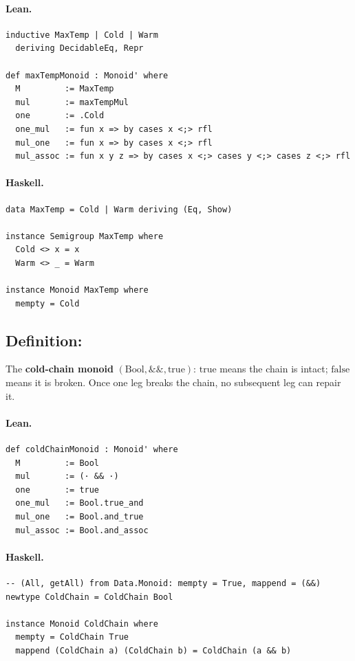 \documentclass[11pt,a4paper]{article}
\begin{document}
\paragraph{Lean.}
\begin{lstlisting}[style=lean]
inductive MaxTemp | Cold | Warm
  deriving DecidableEq, Repr

def maxTempMonoid : Monoid' where
  M         := MaxTemp
  mul       := maxTempMul
  one       := .Cold
  one_mul   := fun x => by cases x <;> rfl
  mul_one   := fun x => by cases x <;> rfl
  mul_assoc := fun x y z => by cases x <;> cases y <;> cases z <;> rfl
\end{lstlisting}

\paragraph{Haskell.}
\begin{lstlisting}[style=haskell]
data MaxTemp = Cold | Warm deriving (Eq, Show)

instance Semigroup MaxTemp where
  Cold <> x = x
  Warm <> _ = Warm

instance Monoid MaxTemp where
  mempty = Cold
\end{lstlisting}


\subsection{Definition: }

\begin{defn}
The \textbf{cold-chain monoid} $(\mathrm{Bool}, \mathbin{\&\&}, \mathrm{true})$:
$\mathrm{true}$ means the chain is intact; $\mathrm{false}$ means it is broken.
Once one leg breaks the chain, no subsequent leg can repair it.
\end{defn}

\paragraph{Lean.}
\begin{lstlisting}[style=lean]
def coldChainMonoid : Monoid' where
  M         := Bool
  mul       := (· && ·)
  one       := true
  one_mul   := Bool.true_and
  mul_one   := Bool.and_true
  mul_assoc := Bool.and_assoc
\end{lstlisting}

\paragraph{Haskell.}
\begin{lstlisting}[style=haskell]
-- (All, getAll) from Data.Monoid: mempty = True, mappend = (&&)
newtype ColdChain = ColdChain Bool

instance Monoid ColdChain where
  mempty = ColdChain True
  mappend (ColdChain a) (ColdChain b) = ColdChain (a && b)
\end{lstlisting}
\end{document}
